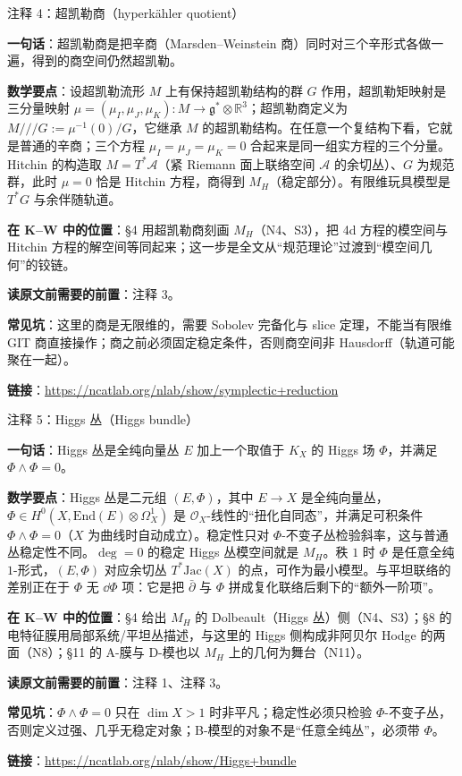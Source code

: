 \begin{kcard}{注释 4：超凯勒商（hyperkähler quotient）}

\textbf{一句话}：超凯勒商是把辛商（Marsden--Weinstein 商）同时对三个辛形式各做一遍，得到的商空间仍然超凯勒。

\textbf{数学要点}：设超凯勒流形 $M$ 上有保持超凯勒结构的群 $G$ 作用，超凯勒矩映射是三分量映射 $\mu=(\mu_I,\mu_J,\mu_K):M\to\mathfrak{g}^*\otimes\mathbb{R}^3$；超凯勒商定义为 $M/\!/\!/G:=\mu^{-1}(0)/G$，它继承 $M$ 的超凯勒结构。在任意一个复结构下看，它就是普通的辛商；三个方程 $\mu_I=\mu_J=\mu_K=0$ 合起来是同一组实方程的三个分量。Hitchin 的构造取 $M=T^*\mathcal{A}$（紧 Riemann 面上联络空间 $\mathcal{A}$ 的余切丛）、$G$ 为规范群，此时 $\mu=0$ 恰是 Hitchin 方程，商得到 $M_H$（稳定部分）。有限维玩具模型是 $T^*G$ 与余伴随轨道。

\textbf{在 K--W 中的位置}：§4 用超凯勒商刻画 $M_H$（N4、S3），把 4d 方程的模空间与 Hitchin 方程的解空间等同起来；这一步是全文从“规范理论”过渡到“模空间几何”的铰链。

\textbf{读原文前需要的前置}：注释 3。

\textbf{常见坑}：这里的商是无限维的，需要 Sobolev 完备化与 slice 定理，不能当有限维 GIT 商直接操作；商之前必须固定稳定条件，否则商空间非 Hausdorff（轨道可能聚在一起）。

\noindent\textbf{链接}：\url{https://ncatlab.org/nlab/show/symplectic+reduction}
\end{kcard}

\begin{kcard}{注释 5：Higgs 丛（Higgs bundle）}

\textbf{一句话}：Higgs 丛是全纯向量丛 $E$ 加上一个取值于 $K_X$ 的 Higgs 场 $\Phi$，并满足 $\Phi\wedge\Phi=0$。

\textbf{数学要点}：Higgs 丛是二元组 $(E,\Phi)$，其中 $E\to X$ 是全纯向量丛，$\Phi\in H^0(X,\mathrm{End}(E)\otimes\Omega^1_X)$ 是 $\mathcal{O}_X$-线性的“扭化自同态”，并满足可积条件 $\Phi\wedge\Phi=0$（$X$ 为曲线时自动成立）。稳定性只对 $\Phi$-不变子丛检验斜率，这与普通丛稳定性不同。$\deg=0$ 的稳定 Higgs 丛模空间就是 $M_H$。秩 $1$ 时 $\Phi$ 是任意全纯 $1$-形式，$(E,\Phi)$ 对应余切丛 $T^*\mathrm{Jac}(X)$ 的点，可作为最小模型。与平坦联络的差别正在于 $\Phi$ 无 $\dd\Phi$ 项：它是把 $\bar\partial$ 与 $\Phi$ 拼成复化联络后剩下的“额外一阶项”。

\textbf{在 K--W 中的位置}：§4 给出 $M_H$ 的 Dolbeault（Higgs 丛）侧（N4、S3）；§8 的电特征膜用局部系统/平坦丛描述，与这里的 Higgs 侧构成非阿贝尔 Hodge 的两面（N8）；§11 的 A-膜与 D-模也以 $M_H$ 上的几何为舞台（N11）。

\textbf{读原文前需要的前置}：注释 1、注释 3。

\textbf{常见坑}：$\Phi\wedge\Phi=0$ 只在 $\dim X>1$ 时非平凡；稳定性必须只检验 $\Phi$-不变子丛，否则定义过强、几乎无稳定对象；B-模型的对象不是“任意全纯丛”，必须带 $\Phi$。

\noindent\textbf{链接}：\url{https://ncatlab.org/nlab/show/Higgs+bundle}
\end{kcard}

